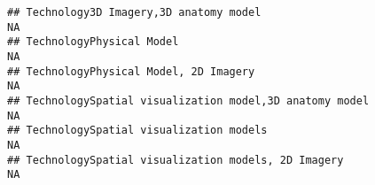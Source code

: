 \documentclass[]{article}
\begin{document}
\begin{verbatim}
## Technology3D Imagery,3D anatomy model                                                                                                                                                                                                                                                                                                                                                                                                                                                 NA
## TechnologyPhysical Model                                                                                                                                                                                                                                                                                                                                                                                                                                                              NA
## TechnologyPhysical Model, 2D Imagery                                                                                                                                                                                                                                                                                                                                                                                                                                                  NA
## TechnologySpatial visualization model,3D anatomy model                                                                                                                                                                                                                                                                                                                                                                                                                                NA
## TechnologySpatial visualization models                                                                                                                                                                                                                                                                                                                                                                                                                                                NA
## TechnologySpatial visualization models, 2D Imagery                                                                                                                                                                                                                                                                                                                                                                                                                                    NA

\end{verbatim}
\end{document}
